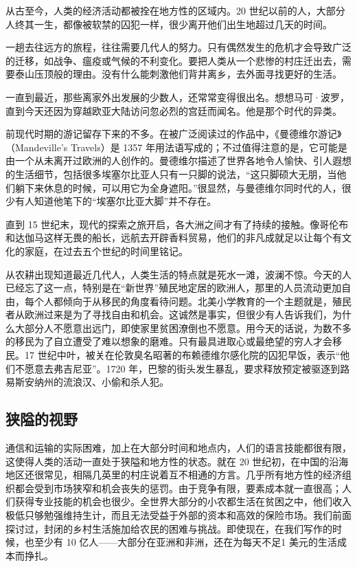 从古至今，人类的经济活动都被拴在地方性的区域内。20 世纪以前的人，大部分人终其一生，都像被软禁的囚犯一样，很少离开他们出生地超过几天的时间。

一趟去往远方的旅程，往往需要几代人的努力。只有偶然发生的危机才会导致广泛的迁移，如战争、瘟疫或气候的不利变化。要把人类从一个悲惨的村庄迁出去，需要泰山压顶般的理由。没有什么能刺激他们背井离乡，去外面寻找更好的生活。

一直到最近，那些离家外出发展的少数人，还常常变得很出名。想想马可·波罗，直到今天还因为穿越欧亚大陆访问忽必烈的宫廷而闻名。他是那个时代的异类。

前现代时期的游记留存下来的不多。在被广泛阅读过的作品中，《曼德维尔游记》（Mandeville’s Travels）是 1357 年用法语写成的；不过值得注意的是，它可能是由一个从未离开过欧洲的人创作的。曼德维尔描述了世界各地令人愉快、引人遐想的生活细节，包括很多埃塞尔比亚人只有一只脚的说法，“这只脚硕大无朋，当他们躺下来休息的时候，可以用它为全身遮阳。”很显然，与曼德维尔同时代的人，很少有人知道他笔下的“埃塞尔比亚大脚”并不存在。

直到 15 世纪末，现代的探索之旅开启，各大洲之间才有了持续的接触。像哥伦布和达伽马这样无畏的船长，远航去开辟香料贸易，他们的非凡成就足以让每个有文化的家庭，在过去五个世纪的时间里铭记。

从农耕出现知道最近几代人，人类生活的特点就是死水一滩，波澜不惊。今天的人已经忘了这一点，特别是在“新世界”殖民地定居的欧洲人，那里的人员流动更加自由，每个人都倾向于从移民的角度看待问题。北美小学教育的一个主题就是，殖民者从欧洲过来是为了寻找自由和机会。这诚然是事实，但很少有人告诉我们，为什么大部分人不愿意出远门，即使家里贫困潦倒也不愿意。用今天的话说，为数不多的移民为了自立遭受了难以想象的磨难。只有最具进取心或最绝望的穷人才会移民。17 世纪中叶，被关在伦敦臭名昭著的布赖德维尔感化院的囚犯早饭，表示“他们不愿意去弗吉尼亚”。1720 年，巴黎的街头发生暴乱，要求释放预定被驱逐到路易斯安纳州的流浪汉、小偷和杀人犯。

\subsection{狭隘的视野}
通信和运输的实际困难，加上在大部分时间和地点内，人们的语言技能都很有限，这使得人类的活动一直处于狭隘和地方性的状态。就在 20 世纪初，在中国的沿海地区还很常见，相隔几英里的村庄说着互不相通的方言。几乎所有地方性的经济组织都会受到市场狭窄和机会丧失的惩罚。由于竞争有限，要素成本就一直很高；人们获得专业技能的机会也很少。全世界大部分的小农都生活在贫困之中，他们收入极低只够勉强维持生计，而且无法受益于外部的资本和高效的保险市场。我们前面探讨过，封闭的乡村生活施加给农民的困难与挑战。即使现在，在我们写作的时候，也至少有 10 亿人——大部分在亚洲和非洲，还在为每天不足1 美元的生活成本而挣扎。

